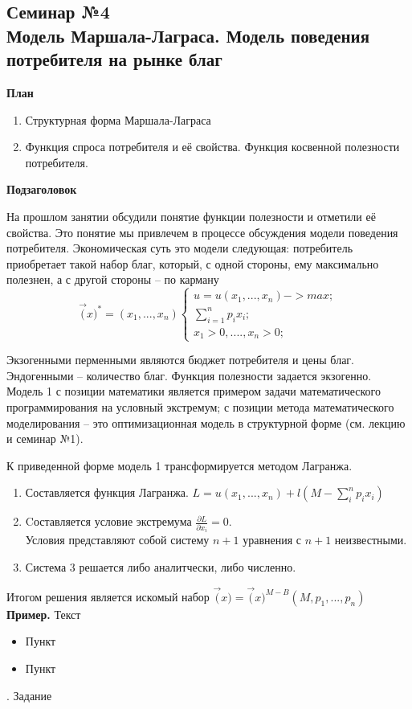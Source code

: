 \documentclass[12pt,a4paper]{article}
\author{Аверьянов Тимофей, Корякин Алексей}
\begin{document}
\begin{center}
\section*{Семинар №4 \\
Модель Маршала-Лаграса. Модель поведения потребителя на рынке благ}
\end{center}
\begin{center}
\textbf{План}
\end{center}
\begin{enumerate}
\item Структурная форма Маршала-Лаграса
\item Функция спроса потребителя и её свойства. Функция косвенной полезности потребителя.
\end{enumerate}
\begin{center}
\textbf{Подзаголовок}
\end{center}

На прошлом занятии обсудили понятие функции полезности и отметили её свойства. Это понятие мы привлечем в процессе обсуждения модели поведения потребителя. Экономическая суть это модели следующая: потребитель приобретает такой набор благ, который, с одной стороны, ему максимально полезнен, а с другой стороны – по карману
\begin{equation}
\vec(x)^*=(x_1, ..., x_n)
\begin{cases}
u=u(x_1, ..., x_n) -> max; \\
\sum_{i=1}^n p_i x_i; \\
x_1 > 0, ...., x_n > 0;
\end{cases}
\end{equation}

Экзогенными перменными являются бюджет потребителя и цены благ.
Эндогенными – количество благ.
Функция полезности задается экзогенно.
Модель 1 с позиции математики является примером задачи математического программирования на условный экстремум; с позиции метода математического моделирования – это оптимизационная модель в структурной форме (см. лекцию и семинар №1).

К приведенной форме модель 1 трансформируется методом Лагранжа.
\begin{enumerate}
  \item Составляется функция Лагранжа. $L=u(x_1, ..., x_n)+l(M-\sum_{i}^n p_i x_i)$
  \item Cоставляется условие экстремума $\frac{\partial L}{\partial x_i}=0 $. \\
  Условия представляют собой систему $n+1$ уравнения с $n+1$ неизвестными.
  \item Система 3 решается либо аналитчески, либо численно.
\end{enumerate}
Итогом решения является искомый набор $\vec(x)=\vec(x)^{M-B}(M, p_1, ..., p_n)$
\textbf{Пример.} Текст
\begin{itemize}
\item Пункт
\item Пункт
\end{itemize}

. Задание
\end{document}
